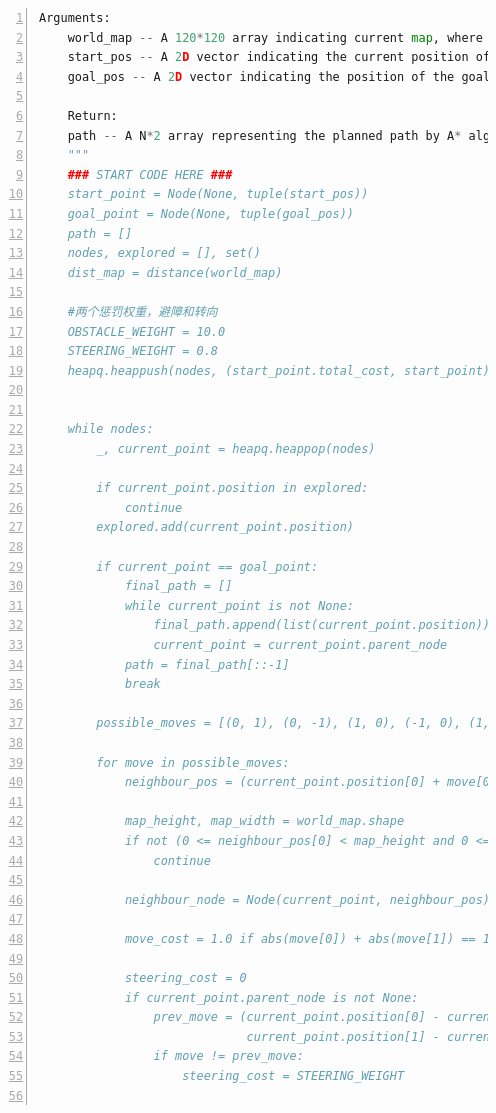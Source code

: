 \documentclass[aps,letterpaper,10pt]{revtex4}
\begin{document}
\begin{lstlisting}[language=Python, caption={Source Code for Task 1 (5-Task\_1.py)}, label={lst:task1_code}, basicstyle=\ttfamily\small, numbers=left, frame=tb, breaklines=true]
    Arguments:
    world_map -- A 120*120 array indicating current map, where 0 indicating traversable and 1 indicating obstacles.
    start_pos -- A 2D vector indicating the current position of the robot.
    goal_pos -- A 2D vector indicating the position of the goal.

    Return:
    path -- A N*2 array representing the planned path by A* algorithm.
    """
    ### START CODE HERE ###
    start_point = Node(None, tuple(start_pos))
    goal_point = Node(None, tuple(goal_pos))
    path = []
    nodes, explored = [], set()
    dist_map = distance(world_map)
    
    #两个惩罚权重，避障和转向
    OBSTACLE_WEIGHT = 10.0  
    STEERING_WEIGHT = 0.8   
    heapq.heappush(nodes, (start_point.total_cost, start_point))

    
    while nodes:
        _, current_point = heapq.heappop(nodes)
        
        if current_point.position in explored:
            continue
        explored.add(current_point.position)
        
        if current_point == goal_point:
            final_path = []
            while current_point is not None:
                final_path.append(list(current_point.position))
                current_point = current_point.parent_node
            path = final_path[::-1]
            break

        possible_moves = [(0, 1), (0, -1), (1, 0), (-1, 0), (1, 1), (1, -1), (-1, 1), (-1, -1)]
        
        for move in possible_moves:
            neighbour_pos = (current_point.position[0] + move[0], current_point.position[1] + move[1])

            map_height, map_width = world_map.shape
            if not (0 <= neighbour_pos[0] < map_height and 0 <= neighbour_pos[1] < map_width) or world_map[neighbour_pos[0]][neighbour_pos[1]] != 0 or neighbour_pos in explored:
                continue
            
            neighbour_node = Node(current_point, neighbour_pos)
            
            move_cost = 1.0 if abs(move[0]) + abs(move[1]) == 1 else 1.414
            
            steering_cost = 0
            if current_point.parent_node is not None:
                prev_move = (current_point.position[0] - current_point.parent_node.position[0],
                             current_point.position[1] - current_point.parent_node.position[1])
                if move != prev_move:
                    steering_cost = STEERING_WEIGHT
            

\end{lstlisting}
\end{document}
